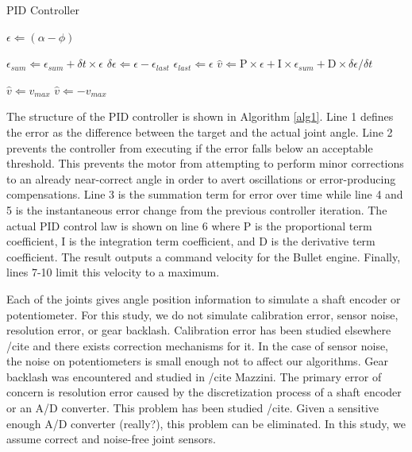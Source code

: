 \begin{algorithm}
\caption{PID Controller}          %
\label{alg1}
\begin{algorithmic}

\State $\epsilon \Leftarrow (\alpha - \phi)$


  \State $\epsilon_{sum} \Leftarrow \epsilon_{sum} + \delta t \times \epsilon$
  \State $\delta \epsilon \Leftarrow \epsilon-\epsilon_{last}$
  \State $\epsilon_{last} \Leftarrow \epsilon$
  \State $\hat{v} \Leftarrow \mathrm{P} \times \epsilon +\mathrm{I} \times \epsilon_{sum}+\mathrm{D} \times \delta \epsilon/\delta t$ 

    \State $\hat{v} \Leftarrow v_{max}$
  \EndIf
    \State $\hat{v} \Leftarrow -v_{max}$
  \EndIf


\EndIf

\end{algorithmic}
\end{algorithm}

The structure of the PID controller is shown in Algorithm \ref{alg1}.  Line 1 defines the error as the difference between the target and the actual joint angle.  Line 2 prevents the controller from executing if the error falls below an acceptable threshold.  This prevents the motor from attempting to perform minor corrections to an already near-correct angle in order to avert oscillations or error-producing compensations.   Line 3 is the summation term for error over time while line 4 and 5 is the instantaneous error change from the previous controller iteration.  The actual PID control law is shown on line 6 where P is the proportional term coefficient, I is the integration term coefficient, and D is the derivative term coefficient.  The result outputs a command velocity for the Bullet engine.  Finally, lines 7-10 limit this velocity to a maximum.

Each of the joints gives angle position information to simulate a shaft encoder or potentiometer.  For this study, we do not simulate calibration error, sensor noise, resolution error, or gear backlash.  Calibration error has been studied elsewhere /cite and there exists correction mechanisms for it.  In the case of sensor noise, the noise on potentiometers is small enough not to affect our algorithms.  Gear backlash was encountered and studied in /cite Mazzini.  The primary error of concern is resolution error caused by the discretization process of a shaft encoder or an A/D converter.   This problem has been studied /cite.  Given a sensitive enough A/D converter (really?), this problem can be eliminated.  In this study, we assume correct and noise-free joint sensors.

